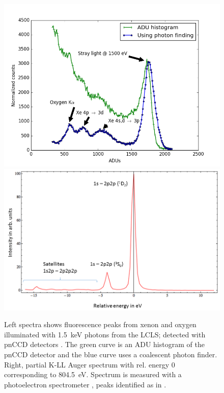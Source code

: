 \begin{figure}
	\centering
		\includegraphics[width=.49\textwidth]{images/pnCCD-histogram.png}
		\includegraphics[width=.49\textwidth]{images/auger-spectra.png}
	\caption[Fluorescence peaks from xenon and neon K-LL Auger spectrum.]{Left spectra shows fluorescence peaks from xenon and oxygen illuminated with \SI{1.5}{\kilo\electronvolt} photons from the LCLS; detected with pnCCD detectors \citep{Bucher-2016-Unpublished, Rudek-2012-NatPho}. The green curve is an ADU histogram of the pnCCD detector and the blue curve uses a coalescent photon finder. Right, partial K-LL Auger spectrum with rel. energy 0 corresponding to \SI{804.5}{\electronvolt}. Spectrum is measured with a photoelectron spectrometer \citep{Bucher-2014-Unpublished}, peaks identified as in \citep{Krause-1970-PhysLettA}.}
	\label{fig:pnCCD-histogram}
\end{figure}
%
